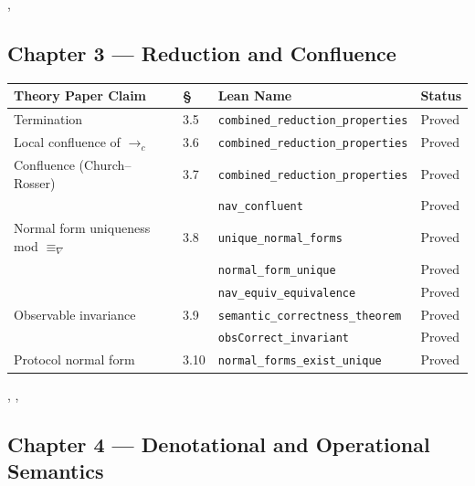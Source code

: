 \noindent{}, 

\subsection*{Chapter 3 — Reduction and Confluence}

\begin{center}
\begin{tabular}{p{5.2cm}lp{5.2cm}l}
\toprule
Theory Paper Claim & \S & Lean Name & Status \\
\midrule
Termination
  & 3.5 & \texttt{combined\_reduction\_properties}      & Proved \\
Local confluence of $\to_c$
  & 3.6 & \texttt{combined\_reduction\_properties}      & Proved \\
Confluence (Church--Rosser)
  & 3.7 & \texttt{combined\_reduction\_properties}      & Proved \\
  &     & \texttt{nav\_confluent}                       & Proved \\
Normal form uniqueness mod $\equiv_\nabla$
  & 3.8 & \texttt{unique\_normal\_forms}                & Proved \\
  &     & \texttt{normal\_form\_unique}                 & Proved \\
  &     & \texttt{nav\_equiv\_equivalence}              & Proved \\
Observable invariance
  & 3.9 & \texttt{semantic\_correctness\_theorem}       & Proved \\
  &     & \texttt{obsCorrect\_invariant}                & Proved \\
Protocol normal form
  & 3.10 & \texttt{normal\_forms\_exist\_unique}        & Proved \\
\bottomrule
\end{tabular}
\end{center}

\noindent{}, ,

\subsection*{Chapter 4 — Denotational and Operational Semantics}


